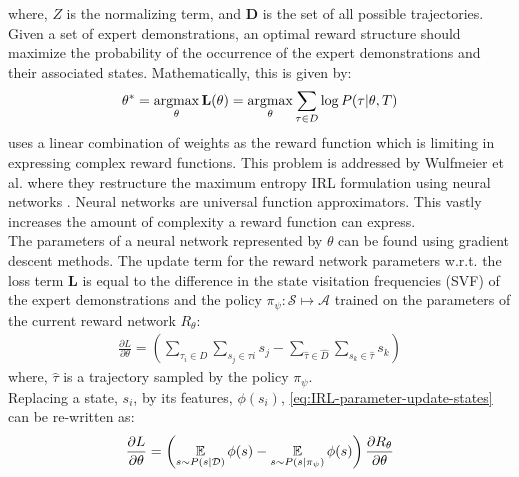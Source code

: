 where, $Z$ is the normalizing term, and $\mathbf{D}$ is the set of all possible trajectories.\\
Given a set of expert demonstrations, an optimal reward structure should maximize the probability of the occurrence of the expert demonstrations and their associated states. Mathematically, this is given by: 
\begin{align}
\label{eq:loglikelihood-IRL}
\theta^{*} = \operatorname*{argmax}_{\theta} \mathbf{L}(\theta) = \operatorname*{argmax}_{\theta} \sum_{\tau \in D} \log{P(\tau| \theta, T)}
\end{align}
\cite{ziebart_maxent_2008} uses a linear combination of weights as the reward function which is limiting in expressing complex reward functions. This problem is addressed by Wulfmeier et al. where they restructure the maximum entropy IRL formulation using neural networks \cite{wulfmeier2015maximum}. Neural networks are universal function approximators. This vastly increases the amount of complexity a reward function can express.\\
The parameters of a neural network represented by $\theta$ can be found using gradient descent methods. The  update term for the reward network parameters w.r.t. the loss term $\mathbf{L}$ is equal to the difference in the state visitation frequencies (SVF) of the expert demonstrations and the policy $\pi_{\psi} : \mathcal{S} \mapsto \mathcal{A} $ trained on the parameters of the current reward network $R_{\theta}$:
\begin{align}
	\label{eq:IRL-parameter-update-states}
	\frac{\partial L}{\partial \theta} = \left(\sum_{\tau_{i} \in D}\sum_{s_{j} \in \tau{i}}s_{j} - \sum_{\hat{\tau} \in \hat{D}}\sum_{s_{k} \in \hat{\tau}}s_{k}\right)
\end{align}
where, $\hat{\tau}$ is a trajectory sampled by the policy $\pi_{\psi}$.\\
Replacing a state, $s_{i}$, by its features, $\phi(s_{i})$, \autoref{eq:IRL-parameter-update-states} can be re-written as:
\begin{align}
	\label{eq:IRL-parameter-update-features}
	\frac{\partial L}{\partial \theta} = \left(\operatorname*{\mathbb{E}}_{s \sim P(s|\mathcal{D})} \phi(s) - \operatorname*{\mathbb{E}}_{s \sim P(s|\pi_\psi)} \phi(s)\right) \frac{\partial R_\theta}{\partial \theta} 
\end{align}
